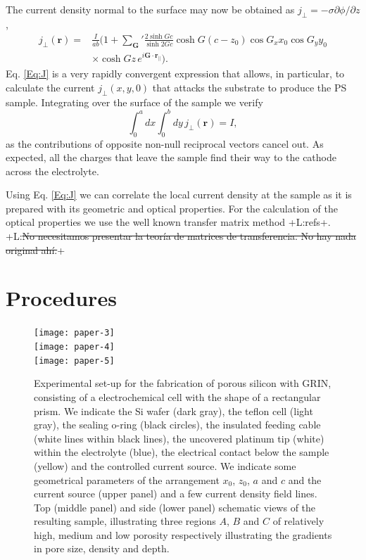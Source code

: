 \documentclass{article}
\newcommand{\notaL}[1]{{\color{blue}+L:#1+}}
\begin{document}
The current density normal to the surface may now be obtained as
$j_\perp=-\sigma\partial\phi/\partial z$,
\begin{equation}
  \label{Eq:J}
  \begin{split}
    j_\perp(\bm r) =& \frac{I}{ab}\biggl(1+{\sum_{\bm G}}'\frac{2\sinh
      Gc}{\sinh 2Gc}\cosh G(c-z_0)\cos G_x x_0 \cos G_y y_0\\
    &\times \cosh Gz\, e^{i\bm G\cdot\bm r_\|}\biggr).
  \end{split}
\end{equation}
Eq. \eqref{Eq:J} is a very rapidly convergent expression that allows,
in particular, to calculate the current $j_\perp(x,y,0)$ that attacks
the substrate to produce the PS sample.
Integrating over the surface of the sample we verify
\begin{equation}
  \label{eq:intj}
  \int_0^adx\int_0^bdy\,j_\perp(\bm r)=I,
\end{equation}
as the contributions of opposite non-null reciprocal vectors cancel
out. As expected, all the charges that leave the sample find
their way  to the cathode across the electrolyte.

Using Eq. \eqref{Eq:J} we can correlate the local current density at
the sample as it is prepared with its geometric and optical
properties. For the calculation of the optical properties we use the
well known transfer matrix method \notaL{refs}.
\notaL{\sout{No necesitamos presentar la teoría de matrices de
  transferencia. No hay nada original ahí.}}


\section{Procedures}
\label{sec:procedures}
\begin{figure}
  \centering
  \texttt{[image: paper-3]}\\[12pt]
  \texttt{[image: paper-4]}\\[12pt]
  \texttt{[image: paper-5]}

  \caption{Experimental set-up for
    the fabrication of porous silicon with GRIN, consisting of a
    electrochemical cell with the shape of a
    rectangular prism. We indicate the Si wafer (dark
    gray), the teflon cell (light gray), the sealing o-ring (black
    circles), the insulated feeding cable (white lines within black
    lines), the uncovered platinum tip (white) within the
    electrolyte (blue), the electrical contact below the sample
    (yellow) and the controlled current source. We indicate some geometrical
    parameters of the arrangement $x_0$, $z_0$, $a$ and $c$
    and the current source (upper panel) and a few current density
    field lines. Top (middle panel) and
    side (lower panel) schematic views of the resulting sample,
    illustrating three regions $A$, $B$ and $C$ of relatively high, medium and
    low porosity respectively illustrating the gradients in pore
    size, density and depth.}
  \label{fig:DE1}
\end{figure}
\end{document}
